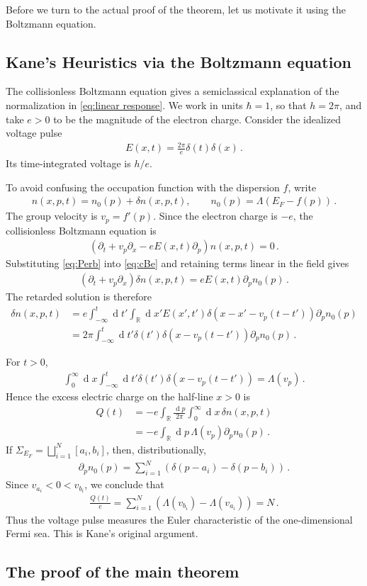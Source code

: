\documentclass[a4paper,10pt]{article}
\numberwithin{equation}{section}
\theoremstyle{plain}
\theoremstyle{plain}
\theoremstyle{plain}
\theoremstyle{plain}
\theoremstyle{plain}
\theoremstyle{remark}
\theoremstyle{definition}
\theoremstyle{plain}
\newcommand{\RR}{\mathbb{R}}
\newcommand{\dif}{\operatorname{d}\!} %
\newcommand{\eq}[1]{\begin{align*}#1\end{align*}}
\newcommand{\eql}[1]{\begin{align}#1\end{align}}
\begin{document}
    
    Before we turn to the actual proof of the theorem, let us motivate it using the Boltzmann equation.

    
    \subsection{Kane's Heuristics via the Boltzmann equation}
    The collisionless Boltzmann equation gives a semiclassical explanation of the normalization in \cref{eq:linear response}. We work in units $\hbar=1$, so that $h=2\pi$, and take $e>0$ to be the magnitude of the electron charge. Consider the idealized voltage pulse
    \eq{E(x,t)=\frac{2\pi}{e}\delta(t)\delta(x)\,.}
    Its time-integrated voltage is $h/e$.

    To avoid confusing the occupation function with the dispersion $f$, write
    \eql{\label{eq:Perb}n(x,p,t)=n_0(p)+\delta n(x,p,t),\qquad n_0(p)=\Lambda(E_F-f(p))\,.}
    The group velocity is $v_p=f'(p)$. Since the electron charge is $-e$, the collisionless Boltzmann equation is
    \eql{\label{eq:cBe}\left(\partial_t+v_p\partial_x-eE(x,t)\partial_p\right)n(x,p,t)=0\,.}
    Substituting \cref{eq:Perb} into \cref{eq:cBe} and retaining terms linear in the field gives
    \eq{\left(\partial_t+v_p\partial_x\right)\delta n(x,p,t)=eE(x,t)\partial_p n_0(p)\,.}
    The retarded solution is therefore
    \eq{\delta n(x,p,t)&=e\int_{-\infty}^{t}\dif{t'}\int_{\RR}\dif{x'}E(x',t')\delta\left(x-x'-v_p(t-t')\right)\partial_p n_0(p)\\
    &=2\pi\int_{-\infty}^{t}\dif{t'}\delta(t')\delta\left(x-v_p(t-t')\right)\partial_p n_0(p)\,.}

    For $t>0$,
    \eq{\int_0^\infty\dif{x}\int_{-\infty}^{t}\dif{t'}\delta(t')\delta\left(x-v_p(t-t')\right)=\Lambda(v_p)\,.}
    Hence the excess electric charge on the half-line $x>0$ is
    \eq{Q(t)&=-e\int_{\RR}\frac{\dif{p}}{2\pi}\int_0^\infty\dif{x}\,\delta n(x,p,t)\\
    &=-e\int_{\RR}\dif{p}\,\Lambda(v_p)\partial_p n_0(p)\,.}
    If $\Sigma_{E_F}=\bigsqcup_{i=1}^{N}[a_i,b_i]$, then, distributionally,
    \eq{\partial_p n_0(p)=\sum_{i=1}^{N}\left(\delta(p-a_i)-\delta(p-b_i)\right)\,.}
    Since $v_{a_i}<0<v_{b_i}$, we conclude that
    \eq{\frac{Q(t)}{e}=\sum_{i=1}^{N}\left(\Lambda(v_{b_i})-\Lambda(v_{a_i})\right)=N\,.}
    Thus the voltage pulse measures the Euler characteristic of the one-dimensional Fermi sea. This is Kane's original argument.

\subsection{The proof of the main theorem}
\end{document}
